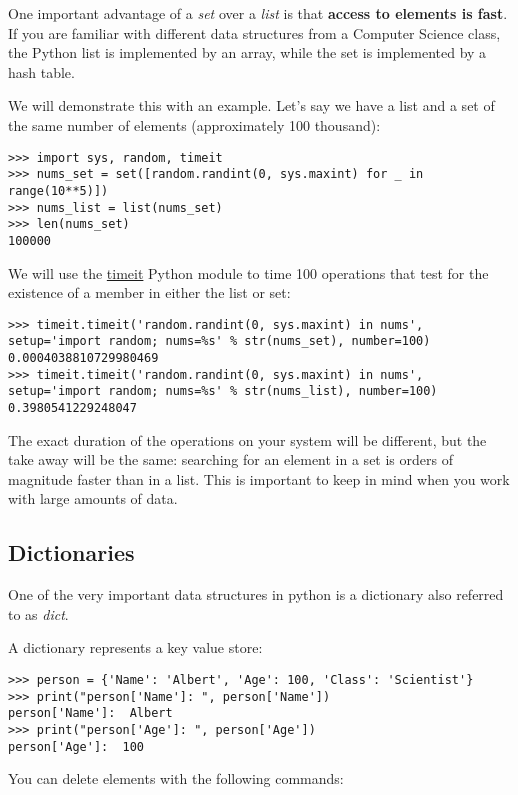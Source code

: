 One important advantage of a \emph{set} over a \emph{list} is that
\textbf{access to elements is fast}. If you are familiar with different
data structures from a Computer Science class, the Python list is
implemented by an array, while the set is implemented by a hash table.

We will demonstrate this with an example. Let's say we have a list and a
set of the same number of elements (approximately 100 thousand):

\begin{verbatim}
>>> import sys, random, timeit
>>> nums_set = set([random.randint(0, sys.maxint) for _ in range(10**5)])
>>> nums_list = list(nums_set)
>>> len(nums_set)
100000
\end{verbatim}

We will use the
\href{https://docs.python.org/2/library/timeit.html}{timeit} Python
module to time 100 operations that test for the existence of a member in
either the list or set:

\begin{verbatim}
>>> timeit.timeit('random.randint(0, sys.maxint) in nums', setup='import random; nums=%s' % str(nums_set), number=100)
0.0004038810729980469
>>> timeit.timeit('random.randint(0, sys.maxint) in nums', setup='import random; nums=%s' % str(nums_list), number=100)
0.3980541229248047
\end{verbatim}

The exact duration of the operations on your system will be different,
but the take away will be the same: searching for an element in a set is
orders of magnitude faster than in a list. This is important to keep in
mind when you work with large amounts of data.

\subsection{Dictionaries}\label{dictionaries}

One of the very important data structures in python is a dictionary also
referred to as \emph{dict}.

A dictionary represents a key value store:

\begin{verbatim}
>>> person = {'Name': 'Albert', 'Age': 100, 'Class': 'Scientist'}
>>> print("person['Name']: ", person['Name'])
person['Name']:  Albert
>>> print("person['Age']: ", person['Age'])
person['Age']:  100
\end{verbatim}

You can delete elements with the following commands:

